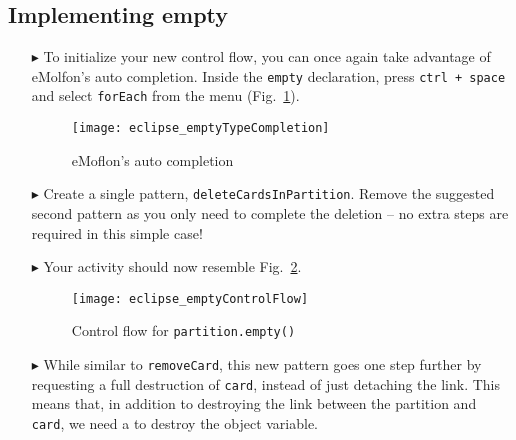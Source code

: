 \newpage
\hypertarget{emptyPartition tex}{}
\subsection{Implementing empty}
\texHeader

\begin{itemize}
 
\item[$\blacktriangleright$] To initialize your new control flow, you can once again take advantage of eMolfon's auto completion. Inside the
\texttt{empty} declaration, press  \texttt{ctrl + space} and select \texttt{forEach} from the menu (Fig.~\ref{fig:typeCompletion}).

\vspace{1cm}

\begin{figure}[htpb]
\begin{center}
  \texttt{[image: eclipse\_emptyTypeCompletion]}
  \caption{eMoflon's auto completion}
  \label{fig:typeCompletion}
\end{center}
\end{figure}

\vspace{1cm}

\item[$\blacktriangleright$] Create a single pattern, \texttt{deleteCardsInPartition}. Remove the suggested second pattern as you only need to complete the
deletion -- no extra steps are required in this simple case!

\item[$\blacktriangleright$] Your activity should now resemble Fig.~\ref{fig:emptyControlFlow}.

\clearpage

\begin{figure}[htpb]
\begin{center}
  \texttt{[image: eclipse\_emptyControlFlow]}
  \caption{Control flow for \texttt{partition.empty()}}
  \label{fig:emptyControlFlow}
\end{center}
\end{figure}

\item[$\blacktriangleright$] While similar to \texttt{removeCard}, this new pattern goes one step further by requesting a full destruction of \texttt{card},
instead of just detaching the link. This means that, in addition to destroying the link between the partition and \texttt{card}, we need a to destroy the object
variable.


\end{itemize}
